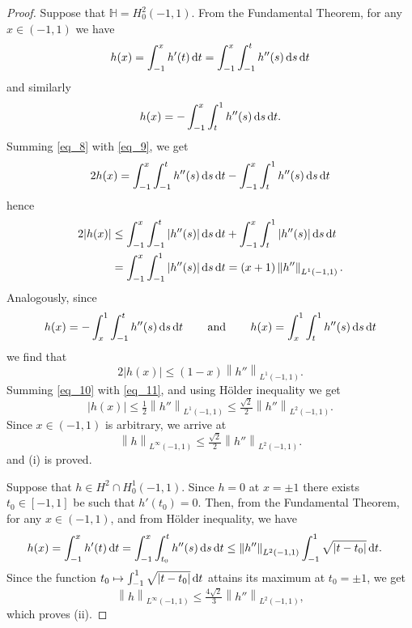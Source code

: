 \documentclass[11pt,a4paper]{amsart}
\theoremstyle{remark}
\theoremstyle{definition}
\numberwithin{equation}{section}
\numberwithin{proposition}{section}
\begin{document}
\begin{proof}
Suppose that $\mathbb{H}= H_0^2(-1,1)$. From the Fundamental Theorem, for any $x\in(-1,1)$ we have
\begin{equation}\label{eq_8}
h(x)=\int_{-1}^xh'(t)\,{\rm d}t=\int_{-1}^x\int_{-1}^th''(s)\,{\rm d}s\,{\rm d}t
\end{equation}
and similarly
\begin{equation}\label{eq_9}
h(x)=-\int_{-1}^x\int_t^1h''(s)\,{\rm d}s\,{\rm d}t.
\end{equation}
Summing \eqref{eq_8} with \eqref{eq_9}, we get
\begin{equation*}
2h(x)=\int_{-1}^x\int_{-1}^th''(s)\,{\rm d}s\,{\rm d}t-\int_{-1}^x\int_t^1h''(s)\,{\rm d}s\,{\rm d}t
\end{equation*}
hence
\begin{equation}\label{eq_10}\begin{aligned}
2|h(x)|&\le\int_{-1}^x\int_{-1}^t|h''(s)|\,{\rm d}s\,{\rm d}t+\int_{-1}^x\int_t^1|h''(s)|\,{\rm d}s\,{\rm d}t\\
&=\int_{-1}^x\int_{-1}^1|h''(s)|\,{\rm d}s\,{\rm d}t =(x+1)\left\|h''\right\|_{L^1(-1,1)}.
\end{aligned}
\end{equation}
Analogously, since
\begin{equation*}
h(x)=-\int_x^1\int_{-1}^th''(s)\,{\rm d}s\,{\rm d}t\hspace{.3in}\mbox{and}\hspace{.3in}h(x)=\int_x^1\int_t^1h''(s)\,{\rm d}s\,{\rm d}t
\end{equation*}
we find that
\begin{equation}\label{eq_11}
2|h(x)|\le(1-x)\left\|h''\right\|_{L^1(-1,1)}.
\end{equation}
Summing \eqref{eq_10} with \eqref{eq_11}, and using H\"older inequality we get
\begin{equation*}
|h(x)|\le\tfrac{1}{2}\left\|h''\right\|_{L^1(-1,1)}\le\tfrac{\sqrt{2}}{2}\left\|h''\right\|_{L^2(-1,1)}.
\end{equation*}
Since $x\in(-1,1)$ is arbitrary, we arrive at
\begin{equation}\label{eq_13}
\left\|h\right\|_{L^\infty(-1,1)}\le\tfrac{\sqrt{2}}{2}\left\|h''\right\|_{L^2(-1,1)}.
\end{equation}
and (i) is proved. \par
Suppose that $h\in H^2\cap H_0^1(-1,1)$. Since $h=0$ at $x=\pm1$ there exists $t_0\in[-1,1]$ be such that $h'(t_0)=0$. Then, from the Fundamental Theorem, for any $x\in(-1,1)$, and from H\"older inequality, we have
\begin{align*}
h(x)&=\int_{-1}^xh'(t)\,{\rm d}t=\int_{-1}^x\int_{t_0}^th''(s)\,{\rm d}s\,{\rm d}t\le\left\|h''\right\|_{L^2(-1,1)}\int_{-1}^1\sqrt{|t-t_0|}\,{\rm d}t.
\end{align*}
Since the function $t_0\mapsto\int_{-1}^1\sqrt{|t-t_0|}\,{\rm d}t$ attains its maximum at $t_0=\pm1$, we get
\begin{equation*}
\left\|h\right\|_{L^\infty(-1,1)}\le\tfrac{4\sqrt{2}}{3}\left\|h''\right\|_{L^2(-1,1)},
\end{equation*}
which proves (ii).\end{proof}
\end{document}
